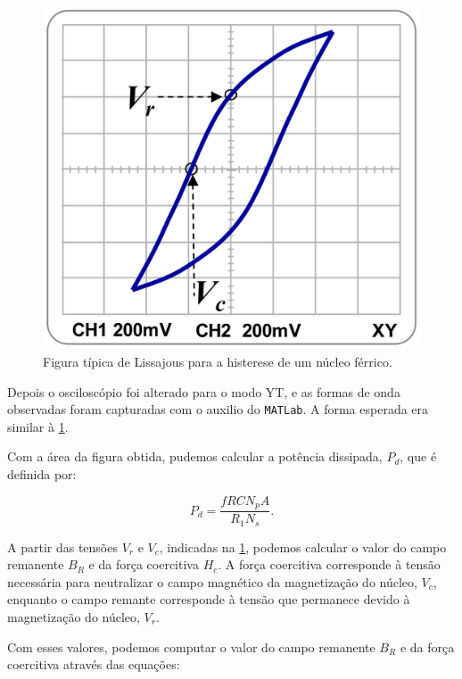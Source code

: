 \documentclass[11pt,a4paper]{article}
\begin{document}
	\begin{figure}[!htb]
    \centering
    \includegraphics[scale=1.0]{Histerese.png}
    \caption{Figura típica de Lissajous para a histerese de um núcleo férrico.}
    \label{Histerese}
    \end{figure}

    Depois o osciloscópio foi alterado para o modo YT, e as formas de onda observadas foram capturadas com o auxilio do \texttt{MATLab}. A forma esperada era similar à \cref{Histerese}.
    
    Com a área da figura obtida, pudemos calcular a potência dissipada, $P_d$, que é definida por:
    
    \begin{equation}
        P_d = \dfrac{f R C N_p A}{R_1 N_s}.
        \label{Pot}
    \end{equation}
    
    A partir das tensões $V_r$ e $V_c$, indicadas na \cref{Histerese}, podemos calcular o valor do campo remanente $B_R$ e da força coercitiva $H_c$. A força coercitiva corresponde à tensão necessária para neutralizar o campo magnético da magnetização do núcleo, $V_c$, enquanto o campo remante corresponde à tensão que permanece devido à magnetização do núcleo, $V_r$.
    
	Com esses valores, podemos computar o valor do campo remanente $B_R$ e da força coercitiva através das equações:
	
\end{document}
